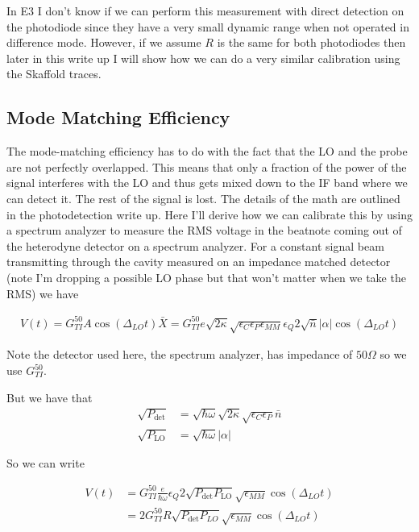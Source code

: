 \documentclass[12pt]{article}
\begin{document}
In E3 I don't know if we can perform this measurement with direct detection on the photodiode since they have a very small dynamic range when not operated in difference mode. However, if we assume $R$ is the same for both photodiodes then later in this write up I will show how we can do a very similar calibration using the Skaffold traces.

\subsection{Mode Matching Efficiency}

The mode-matching efficiency has to do with the fact that the LO and the probe are not perfectly overlapped. This means that only a fraction of the power of the signal interferes with the LO and thus gets mixed down to the IF band where we can detect it. The rest of the signal is lost. The details of the math are outlined in the photodetection write up. Here I'll derive how we can calibrate this by using a spectrum analyzer to measure the RMS voltage in the beatnote coming out of the heterodyne detector on a spectrum analyzer. For a constant signal beam transmitting through the cavity measured on an impedance matched detector (note I'm dropping a possible LO phase but that won't matter when we take the RMS) we have

\begin{align}
V(t) = G_{TI}^{50} A \cos(\Delta_{LO} t) \bar{X} = G_{TI}^{50} e \sqrt{2\kappa} \sqrt{\epsilon_C \epsilon_P \epsilon_{MM}} \epsilon_Q 2\sqrt{\bar{n}} |\alpha| \cos\left(\Delta_{LO}t\right)
\end{align}

Note the detector used here, the spectrum analyzer, has impedance of $50 \Omega$ so we use $G_{TI}^{50}$.

But we have that 
\begin{align}
\sqrt{P_{\text{det}}} &= \sqrt{\hbar \omega} \sqrt{2\kappa} \sqrt{\epsilon_C \epsilon_P} \bar{n}\\
\sqrt{P_{\text{LO}}} &= \sqrt{\hbar \omega} |\alpha|
\end{align}

So we can write

\begin{align}
V(t) &= G_{TI}^{50} \frac{e}{\hbar \omega}\epsilon_Q 2 \sqrt{P_{\text{det}} P_{\text{LO}}} \sqrt{\epsilon_{MM}}\cos(\Delta_{LO} t)\\
&= 2 G_{TI}^{50} R \sqrt{P_{\text{det}}P_{LO}} \sqrt{\epsilon_{MM}} \cos(\Delta_{LO} t)
\end{align}
\end{document}
